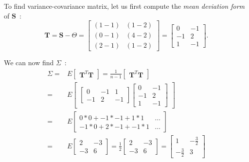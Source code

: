 \documentclass[11pt,twocolumn]{amsart} %
\begin{document}
To find variance-covariance matrix, let us first compute the \emph{mean deviation form} of $\textbf{S}$~:
\begin{equation*}
  \textbf{T} = \textbf{S} - \Theta = \begin{bmatrix} (1-1) & (1-2) \\ (0-1) & (4-2) \\ (2-1) & (1-2)\end{bmatrix} = \begin{bmatrix} 0 & -1 \\ -1 & 2 \\ 1 & -1\end{bmatrix}.
\end{equation*}

We can now find $\Sigma$~:
\begin{align*}
  \Sigma = & E \begin{bmatrix} \textbf{T}^T\textbf{T}\end{bmatrix} = \frac{1}{n-1} \begin{bmatrix} \textbf{T}^T\textbf{T}\end{bmatrix} \\
         = & E \begin{bmatrix} \begin{bmatrix} 0 & -1 & 1 \\ -1 & 2 & -1\end{bmatrix} \begin{bmatrix} 0 & -1 \\ -1 & 2 \\ 1 & -1\end{bmatrix} \end{bmatrix} \\
         = & E \begin{bmatrix} 0*0 + -1*-1 + 1*1 & \hdots \\ -1*0 + 2*-1 + -1*1 & \hdots \end{bmatrix} \\
         = & E \begin{bmatrix} 2 & -3 \\ -3 & 6 \end{bmatrix} = \frac{1}{2} \begin{bmatrix} 2 & -3 \\ -3 & 6 \end{bmatrix}
         = \begin{bmatrix} 1 & -\frac{3}{2} \\ -\frac{3}{2} & 3\end{bmatrix}
\end{align*}
\end{document}
